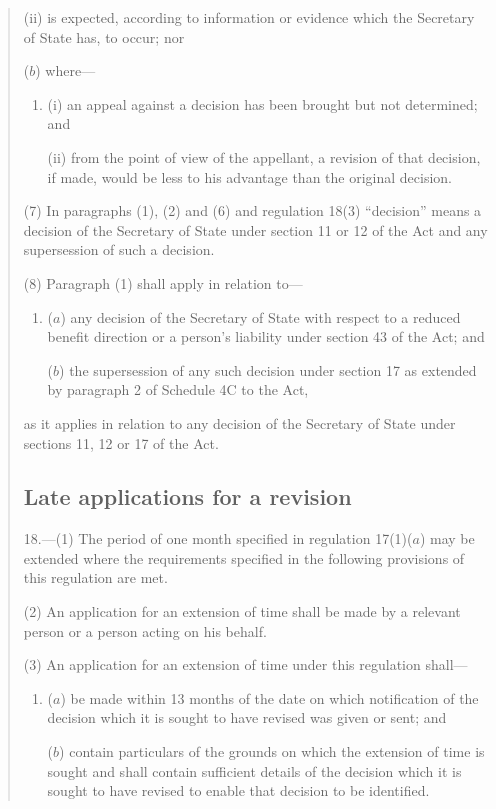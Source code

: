 \documentclass[12pt,a4paper]{article}
\begin{document}
\begin{quotation}
\begin{enumerate}
\begin{enumerate}
(ii) is expected, according to information or evidence which the Secretary of State has, to occur; nor
\end{enumerate}

($b$) where---
\begin{enumerate}\item[]
(i) an appeal against a decision has been brought but not determined; and

(ii) from the point of view of the appellant, a revision of that decision, if made, would be less to his advantage than the original decision.
\end{enumerate}
\end{enumerate}

(7) In paragraphs (1), (2) and (6) and regulation 18(3) “decision” means a decision of the Secretary of State under section 11 or 12 of the Act and any supersession of such a decision.

(8) Paragraph (1) shall apply in relation to---
\begin{enumerate}\item[]
($a$) any decision of the Secretary of State with respect to a reduced benefit direction or a person’s liability under section 43 of the Act; and

($b$) the supersession of any such decision under section 17 as extended by paragraph 2 of Schedule 4C to the Act,
\end{enumerate}
as it applies in relation to any decision of the Secretary of State under sections 11, 12 or 17 of the Act.

\subsection*{Late applications for a revision}

18.—(1) The period of one month specified in regulation 17(1)($a$) may be extended where the requirements specified in the following provisions of this regulation are met.

(2) An application for an extension of time shall be made by a relevant person or a person acting on his behalf.

(3) An application for an extension of time under this regulation shall---
\begin{enumerate}\item[]
($a$) be made within 13 months of the date on which notification of the decision which it is sought to have revised was given or sent; and

($b$) contain particulars of the grounds on which the extension of time is sought and shall contain sufficient details of the decision which it is sought to have revised to enable that decision to be identified.
\end{enumerate}


\end{quotation}
\end{document}

